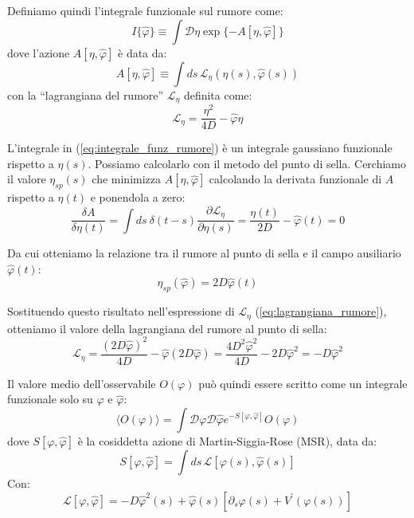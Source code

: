 Definiamo quindi l'integrale funzionale sul rumore come:
\begin{equation}
I\{\hat{\varphi}\}\equiv\int\mathcal{D}\eta \exp\{-A[\eta,\hat{\varphi}]\}
\label{eq:integrale_funz_rumore}
\end{equation}
dove l'azione $A[\eta,\hat{\varphi}]$ è data da:
\begin{equation}
A[\eta,\hat{\varphi}] \equiv\int ds \, \mathcal{L}_{\eta}(\eta(s),\hat{\varphi}(s))
\end{equation}
con la ``lagrangiana del rumore'' $\mathcal{L}_{\eta}$ definita come:
\begin{equation}
\mathcal{L}_{\eta}=\frac{\eta^{2}}{4D}-\hat{\varphi}\eta
\label{eq:lagrangiana_rumore}
\end{equation}

L'integrale in (\ref{eq:integrale_funz_rumore}) è un integrale gaussiano funzionale rispetto a $\eta(s)$. Possiamo calcolarlo con il metodo del punto di sella. Cerchiamo il valore $\eta_{sp}(s)$ che minimizza $A[\eta,\hat{\varphi}]$ calcolando la derivata funzionale di $A$ rispetto a $\eta(t)$ e ponendola a zero:
\begin{equation}
\frac{\delta A}{\delta\eta(t)}=\int ds~\delta(t-s)\frac{\partial\mathcal{L}_{\eta}}{\partial\eta(s)} = \frac{\eta(t)}{2D}-\hat{\varphi}(t)=0
\end{equation}

Da cui otteniamo la relazione tra il rumore al punto di sella e il campo ausiliario $\hat{\varphi}(t)$:
\begin{equation}
\eta_{sp}(\hat{\varphi})=2D\hat{\varphi}(t)
\label{eq:rumore_sella}
\end{equation}

Sostituendo questo risultato nell'espressione di $\mathcal{L}_{\eta}$ (\ref{eq:lagrangiana_rumore}), otteniamo il valore della lagrangiana del rumore al punto di sella:
\begin{equation} 
\mathcal{L}_{\eta} = \frac{(2D\hat{\varphi})^2}{4D} - \hat{\varphi}(2D\hat{\varphi}) = \frac{4D^2\hat{\varphi}^2}{4D} - 2D\hat{\varphi}^2 = -D\hat{\varphi}^2 
\end{equation}

Il valore medio dell'osservabile $O(\varphi)$ può quindi essere scritto come un integrale funzionale solo su $\varphi$ e $\hat{\varphi}$:
\begin{equation}
\langle O(\varphi)\rangle=\int\mathcal{D}\varphi\mathcal{D}\hat{\varphi}e^{-S[\varphi,\hat{\varphi}]}O(\varphi)
\label{eq:msr_valore_medio}
\end{equation}
dove $S[\varphi,\hat{\varphi}]$ è la cosiddetta azione di Martin-Siggia-Rose (MSR), data da:
\begin{equation} 
S[\varphi,\hat{\varphi}] = \int ds \, \mathcal{L}[\varphi(s),\hat{\varphi}(s)] 
\end{equation}
Con:
\begin{equation}
\mathcal{L}[\varphi,\hat{\varphi}] = -D\hat{\varphi}^{2}(s) + \hat{\varphi}(s)[\partial_{s}\varphi(s)+V^{\prime}(\varphi(s))]
\end{equation}

